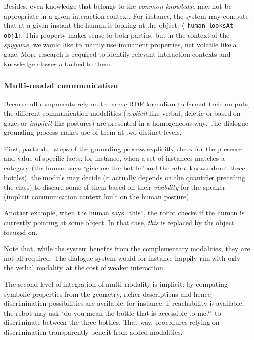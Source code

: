 \documentclass[preprint,12pt]{elsarticle}
\newcommand{\stmt}[1]{{\footnotesize \tt $\langle$ #1\relax$\rangle$}}
\begin{document}
Besides, even knowledge that belongs to the \emph{common knowledge} may not be
appropriate in a given interaction context. For instance, the system may
compute that at a given instant the human is looking at the object: \stmt{human
looksAt obj1}. This property makes sense to both parties, but in the context of
the \emph{spygame}, we would like to mainly use immanent properties, not
volatile like a gaze. More research is required to identify relevant
interaction contexts and knowledge classes attached to them.

\subsubsection{Multi-modal communication}

Because all components rely on the same RDF formalism to format their outputs,
the different communication modalities (\emph{explicit} like verbal, deictic or
based on gaze, or \emph{implicit} like postures) are presented in a homogeneous
way. The dialogue grounding process makes use of them at two distinct levels.

First, particular steps of the grounding process explicitly check for the
presence and value of specific facts: for instance, when a set of instances
matches a category (the human says ``give me the bottle'' and the robot knows
about three bottles), the module may decide (it actually depends on the
quantifier preceding the class) to discard some of them based on their
\emph{visibility} for the speaker (implicit communication context built on the
human posture).

Another example, when the human says ``this'', the robot checks if the human is
currently pointing at some object. In that case, \emph{this} is replaced by the
object focused on.

Note that, while the system benefits from the complementary modalities, they
are not all required. The dialogue system would for instance happily run with
only the verbal modality, at the cost of weaker interaction.

The second level of integration of multi-modality is implicit: by computing
symbolic properties from the geometry, richer descriptions and hence
discrimination possibilities are available: for instance, if reachability is
available, the robot may ask ``do you mean the bottle that is accessible to
me?'' to discriminate between the three bottles. That way, procedures relying
on discrimination transparently benefit from added modalities.
\end{document}
